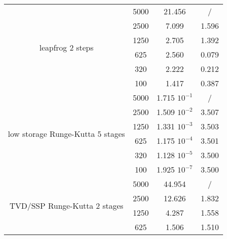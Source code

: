 \documentclass[pdftex,preprint,3p,times,numbers]{elsarticle}
\begin{document}
\begin{table}[!ht]
{\begin{tabular}{cccc}
    \cmidrule{2-4}
    \multirow{6}{*}{leapfrog 2 steps}
                                             & 5000            & 21.456          & /                                \\
                                             & 2500            & 7.099           & 1.596                            \\
                                             & 1250            & 2.705           & 1.392                            \\
                                             & 625             & 2.560           & 0.079                            \\
                                             & 320             & 2.222           & 0.212                            \\
                                             & 100             & 1.417           & 0.387                            \\
    \cmidrule{2-4}
    \multirow{6}{*}{low storage Runge-Kutta 5 stages}
                                             & 5000            & 1.715 $10^{-1}$ & /                                \\
                                             & 2500            & 1.509 $10^{-2}$ & 3.507                            \\
                                             & 1250            & 1.331 $10^{-3}$ & 3.503                            \\
                                             & 625             & 1.175 $10^{-4}$ & 3.501                            \\
                                             & 320             & 1.128 $10^{-5}$ & 3.500                            \\
                                             & 100             & 1.925 $10^{-7}$ & 3.500                            \\
    \cmidrule{2-4}
    \multirow{6}{*}{TVD/SSP Runge-Kutta 2 stages}
                                             & 5000            & 44.954          & /                                \\
                                             & 2500            & 12.626          & 1.832                            \\
                                             & 1250            & 4.287           & 1.558                            \\
                                             & 625             & 1.506           & 1.510                            \\

\end{tabular}}
\end{table}
\end{document}
